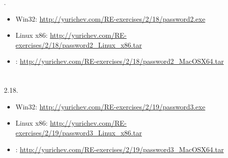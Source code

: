 .

\begin{itemize}
\item Win32: \url{http://yurichev.com/RE-exercises/2/18/password2.exe}
\item Linux x86: \url{http://yurichev.com/RE-exercises/2/18/password2_Linux_x86.tar}
\item \MacOSX: \url{http://yurichev.com/RE-exercises/2/18/password2_MacOSX64.tar}
\end{itemize}

\section{}

 2.18.

\begin{itemize}
\item Win32: \url{http://yurichev.com/RE-exercises/2/19/password3.exe}
\item Linux x86: \url{http://yurichev.com/RE-exercises/2/19/password3_Linux_x86.tar}
\item \MacOSX: \url{http://yurichev.com/RE-exercises/2/19/password3_MacOSX64.tar}
\end{itemize}


